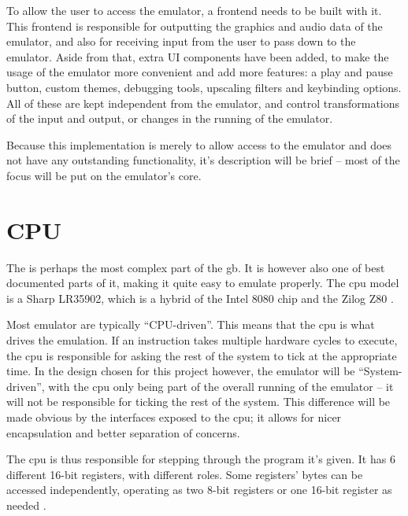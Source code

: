 \documentclass[11pt]{informatics-report}
\begin{document}
To allow the user to access the emulator, a frontend needs to be built with it. This frontend is responsible for outputting the graphics and audio data of the emulator, and also for receiving input from the user to pass down to the emulator. Aside from that, extra UI components have been added, to make the usage of the emulator more convenient and add more features: a play and pause button, custom themes, debugging tools, upscaling filters and keybinding options. All of these are kept independent from the emulator, and control transformations of the input and output, or changes in the running of the emulator.

Because this implementation is merely to allow access to the emulator and does not have any outstanding functionality, it's description will be brief -- most of the focus will be put on the emulator's core.

\section{CPU}

The  is perhaps the most complex part of the \gls{gb}. It is however also one of best documented parts of it, making it quite easy to emulate properly. The \gls{cpu} model is a Sharp LR35902, which is a hybrid of the Intel 8080 chip and the Zilog Z80 \cite{gbcpumanual}.

Most emulator are typically ``CPU-driven''. This means that the \gls{cpu} is what drives the emulation. If an instruction takes multiple hardware cycles to execute, the \gls{cpu} is responsible for asking the rest of the system to tick at the appropriate time. In the design chosen for this project however, the emulator will be ``System-driven'', with the \gls{cpu} only being part of the overall running of the emulator -- it will not be responsible for ticking the rest of the system. This difference will be made obvious by the interfaces exposed to the \gls{cpu}; it allows for nicer encapsulation and better separation of concerns.

The \gls{cpu} is thus responsible for stepping through the program it's given. It has 6 different 16-bit registers, with different roles. Some registers' bytes can be accessed independently, operating as two 8-bit registers or one 16-bit register as needed \cite[CPU Registers and Flags]{pandoc}.
\end{document}
